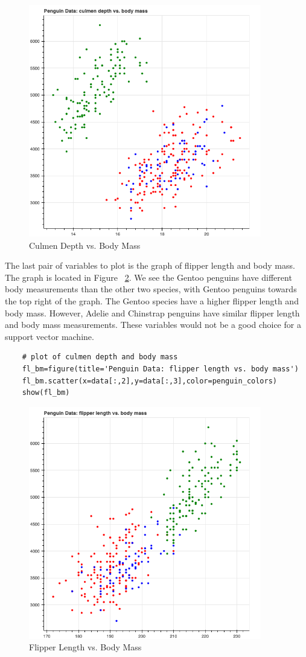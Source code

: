 \documentclass[12pt]{article}
\begin{document}
\begin{figure}[H]
    \centering
    \includegraphics[width=4in]{Figures/penguins/cd_bm.png}
    \caption{Culmen Depth vs. Body Mass}
    \label{fig_cd_bm}
\end{figure}

The last pair of variables to plot is the graph of flipper length and body mass. The graph is located in Figure ~\ref{fig_fl_bm}. We see the Gentoo penguins have different body measurements than the other two species, with Gentoo penguins towards the top right of the graph. The Gentoo species have a higher flipper length and body mass. However, Adelie and Chinstrap penguins have similar flipper length and body mass measurements. These variables would not be a good choice for a support vector machine.

\begin{verbatim}
    # plot of culmen depth and body mass
    fl_bm=figure(title='Penguin Data: flipper length vs. body mass')
    fl_bm.scatter(x=data[:,2],y=data[:,3],color=penguin_colors)
    show(fl_bm)
\end{verbatim}

\begin{figure}[H]
    \centering
    \includegraphics[width=4in]{Figures/penguins/fl_bm.png}
    \caption{Flipper Length vs. Body Mass}
    \label{fig_fl_bm}
\end{figure}
\end{document}
